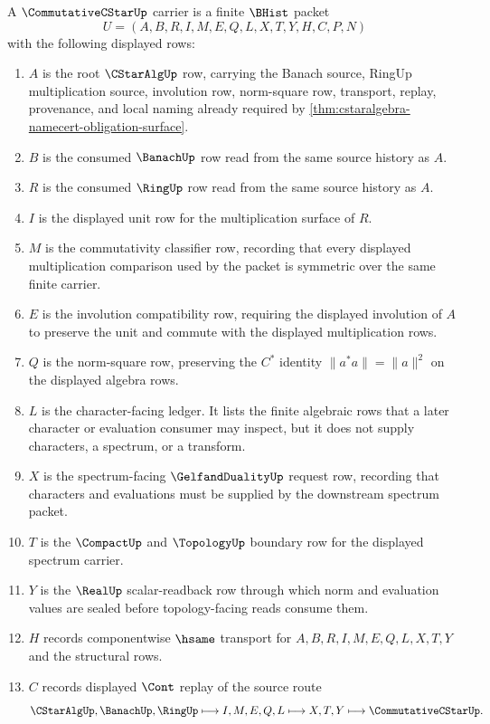 \begin{definition}
\label{def:commutative-c-star-carrier}
A $\CommutativeCStarUp$ carrier is a finite $\BHist$ packet
$$
U=(A,B,R,I,M,E,Q,L,X,T,Y,H,C,P,N)
$$
with the following displayed rows:
\begin{enumerate}
\item $A$ is the root $\CStarAlgUp$ row, carrying the Banach source, RingUp multiplication source, involution row, norm-square row, transport, replay, provenance, and local naming already required by \autoref{thm:cstaralgebra-namecert-obligation-surface}.
\item $B$ is the consumed $\BanachUp$ row read from the same source history as $A$.
\item $R$ is the consumed $\RingUp$ row read from the same source history as $A$.
\item $I$ is the displayed unit row for the multiplication surface of $R$.
\item $M$ is the commutativity classifier row, recording that every displayed multiplication comparison used by the packet is symmetric over the same finite carrier.
\item $E$ is the involution compatibility row, requiring the displayed involution of $A$ to preserve the unit and commute with the displayed multiplication rows.
\item $Q$ is the norm-square row, preserving the $C^*$ identity $\|a^*a\|=\|a\|^2$ on the displayed algebra rows.
\item $L$ is the character-facing ledger. It lists the finite algebraic rows that a later character or evaluation consumer may inspect, but it does not supply characters, a spectrum, or a transform.
\item $X$ is the spectrum-facing $\GelfandDualityUp$ request row, recording that characters and evaluations must be supplied by the downstream spectrum packet.
\item $T$ is the $\CompactUp$ and $\TopologyUp$ boundary row for the displayed spectrum carrier.
\item $Y$ is the $\RealUp$ scalar-readback row through which norm and evaluation values are sealed before topology-facing reads consume them.
\item $H$ records componentwise $\hsame$ transport for $A,B,R,I,M,E,Q,L,X,T,Y$ and the structural rows.
\item $C$ records displayed $\Cont$ replay of the source route
$$
\CStarAlgUp,\BanachUp,\RingUp \longmapsto I,M,E,Q,L \longmapsto X,T,Y \longmapsto \CommutativeCStarUp .
$$
\end{enumerate}
\end{definition}
